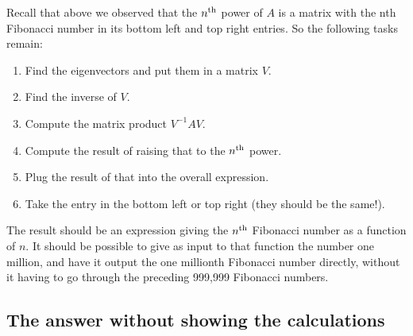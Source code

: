 \begin{lemma}
Recall that above we observed that the $n^{\text{th}}$ power of $A$ is a matrix with the
nth Fibonacci number in its bottom left and top right entries. So the following
tasks remain:
\begin{enumerate}
\item Find the eigenvectors and put them in a matrix $V$.
\item Find the inverse of $V$.
\item Compute the matrix product $V^{-1}AV$.
\item Compute the result of raising that to the $n^{\text{th}}$ power.
\item Plug the result of that into the overall expression.
\item Take the entry in the bottom left or top right (they should be the same!).
\end{enumerate}

The result should be an expression giving the $n^{\text{th}}$ Fibonacci number as a
function of $n$. It should be possible to give as input to that function the
number one million, and have it output the one millionth Fibonacci number
directly, without it having to go through the preceding 999,999 Fibonacci
numbers.


\subsection*{The answer without showing the calculations}


\end{lemma}
